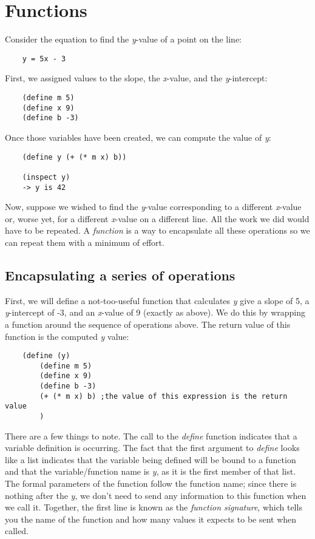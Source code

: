 \chapter{Functions}
\label{Functions}

Consider the equation to find
the {\it y}-value of a point on the line:

\begin{verbatim}
    y = 5x - 3
\end{verbatim}
    
First, we assigned values to the slope,
the {\it x}-value, and the {\it y}-intercept:

\begin{verbatim}
    (define m 5)
    (define x 9)
    (define b -3)
\end{verbatim}

Once those variables have been created,
we can compute the value of {\it y}:

\begin{verbatim}
    (define y (+ (* m x) b))

    (inspect y)
    -> y is 42
\end{verbatim}

Now, suppose we wished to find the {\it y}-value corresponding to
a different {\it x}-value or, worse yet, for a different {\it x}-value
on a different line. All the work we did would have to be
repeated. A {\it function} is a way to encapsulate all these operations
so we can repeat them with a minimum of effort.

\section{Encapsulating a series of operations}

First, we will define a not-too-useful function that
calculates {\it y} give a slope of 5,
a {\it y}-intercept of -3, and an
{\it x}-value of 9 (exactly
as above). We do this by wrapping a function around
the sequence of operations above.
The return value of this function is the computed {\it y} value:

\begin{verbatim}
    (define (y)
        (define m 5)
        (define x 9)
        (define b -3)
        (+ (* m x) b) ;the value of this expression is the return value
        )
\end{verbatim}

There are a few things to note. The call to the {\it define}
function indicates
that a variable definition is occurring. The fact that the first
argument to {\it define} looks like a list indicates that the variable
being defined will be bound to a function and that the variable/function
name is {\it y}, as it is the first member of that list.
The formal parameters of the function follow the function name;
since there is nothing after the {\it y}, we don't
need to send any information to this function when we call it.
Together, the first line is known as the {\it function signature},
which tells you the name of the function and how many values
it expects to be sent when called.

